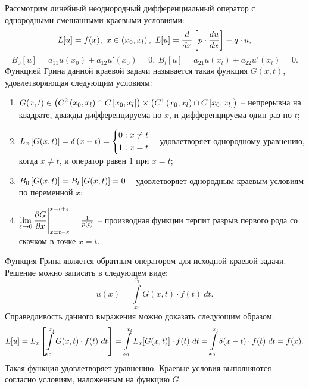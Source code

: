 	Рассмотрим линейный неоднородный дифференциальный оператор с однородными смешанными краевыми условиями:
	\[ L[u] = f(x), ~ x \in \left( x_0, x_l \right), ~ L[u] = \dfrac{d }{d x} \left[ p \cdot \dfrac{d u}{d x} \right] - q \cdot u, \]
	\[ B_0[u] = a_{11} u(x_0) + a_{12} u'(x_0) = 0, ~ B_l[u] = a_{21} u(x_l) + a_{22} u'(x_l) = 0. \]
	Функцией Грина данной краевой задачи называется такая функция $G(x, t)$, удовлетворяющая следующим условиям:
	\begin{enumerate}
		\item $G(x, t) \in \left( C^2 \left( x_0, x_l \right) \cap C\left[ x_0, x_l \right] \right) \times \left( C^1 \left( x_0, x_l \right) \cap C\left[ x_0, x_l \right] \right)$ -- непрерывна на квадрате, дважды дифференцируема по $x$, и дифференцируема один раз по $t$;
		\item $L_x \left[ G(x, t) \right] = \delta\left( x - t \right) = \left\lbrace \begin{aligned} & 0: x \neq t \\ & 1: x = t  \end{aligned} \right.$ -- удовлетворяет однородному уравнению, когда $x \neq t$, и оператор равен $1$ при $x = t$;
		\item $B_0\left[ G(x, t) \right] = B_l\left[ G(x, t) \right] = 0$ -- удовлетворяет однородным краевым условиям по переменной $x$;
		\item $\lim\limits_{\varepsilon \to 0} \dfrac{\partial G}{\partial x} \Biggl\vert \Biggr._{x = t - \varepsilon}^{x = t + \varepsilon} = \frac{1}{p(t)}$ -- производная функции терпит разрыв первого рода со скачком в точке $x = t$.
	\end{enumerate}

	Функция Грина является обратным оператором для исходной краевой задачи. Решение можно записать в следующем виде:
	\[ u(x) = \int\limits_{x_0}^{x_l} G(x, t) \cdot f(t) ~ dt. \]
	Справедливость данного выражения можно доказать следующим образом:
	\[ L[u] = L_x\left[ \int\limits_{x_0}^{x_l} G(x, t) \cdot f(t) ~ dt \right] = \int\limits_{x_0}^{x_l} L_x[G(x, t)] \cdot f(t) ~ dt = \int\limits_{x_0}^{x_l} \delta(x - t) \cdot f(t) ~ dt = f(x). \]
	Такая функция удовлетворяет уравнению. Краевые условия выполняются согласно условиям, наложенным на функцию $G$.

